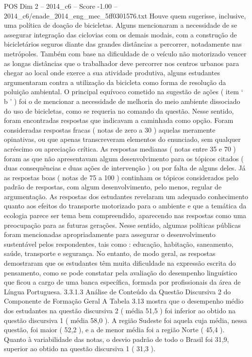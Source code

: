 \begin{textsample}{POS Dim 2 – 2014\_c6 – Score -1.00 – 2014\_c6/enade\_2014\_eng\_mec\_5ff0301576.txt}
Houve quem sugerisse, inclusive, uma política de doação de bicicletas.
Alguns mencionaram a necessidade de se assegurar integração das ciclovias com os demais modais, com a construção de bicicletários seguros diante das grandes distâncias a percorrer, notadamente nas metrópoles.
Também com base na dificuldade de o veículo não motorizado vencer as longas distâncias que o trabalhador deve percorrer nos centros urbanos para chegar ao local onde exerce a sua atividade produtiva, alguns estudantes argumentaram contra a utilização da bicicleta como forma de resolução da poluição ambiental.
O principal equívoco cometido na sugestão de ações ( item ‘ b ’ ) foi o de mencionar a necessidade de melhoria do meio ambiente dissociado do uso de bicicletas, como se requeria no comando da questão.
Nesse sentido, foram encontradas respostas que indicavam a caminhada como opção.
Foram consideradas respostas fracas ( notas de zero a 30 ) aquelas meramente opinativas, ou que apenas transcreveram elementos do enunciado, sem qualquer acréscimo ou apreciação crítica.
As respostas medianas ( notas entre 35 e 70 ) foram as que não apresentavam algum desenvolvimento para os tópicos citados ( duas consequências e duas ações de intervenção ) ou por falta de alguns deles.
Já as respostas boas ( notas de 75 a 100 ) continham os tópicos considerados pelo padrão de respostas, com algum desenvolvimento, pelo menos, regular de argumentação.
As respostas dos estudantes revelaram um adequado conhecimento quanto aos efeitos do transporte motorizado para o ambiente e que a temática da ecologia parece ser tema bem compreendido, aparecendo nas respostas como uma preocupação para as futuras gerações.
Nesse sentido, algumas políticas públicas foram mencionadas apropriadamente para assegurar o desenvolvimento sustentável pelos respondentes, tais como : educação, habitação, saneamento, saúde, transporte e segurança.
No entanto, de modo geral, as respostas demostraram que os estudantes têm muita dificuldade na expressão escrita do pensamento, como se pode constatar pela avaliação do desempenho linguístico que ficou a cargo de uma banca específica, formada por profissionais da área de Língua Portuguesa. 3.3.1.3 Análise de Conteúdo da Questão Discursiva 2 do Componente de Formação Geral A Tabela 3.13 mostra que o desempenho médio dos estudantes na questão discursiva 2 ( média 51,5 ) foi inferior ao obtido na questão discursiva 1 ( média 58,0 ).
A região Sudeste foi aquela cuja média, nessa questão, foi maior ( 52,2 ), e a de menor média foi a região Norte ( 45,4 ).
Quanto à variabilidade das notas, o desvio padrão de todo o Brasil foi 31,9, superior ao obtido na questão discursiva 1 ( 31,3 ).

\end{textsample}
